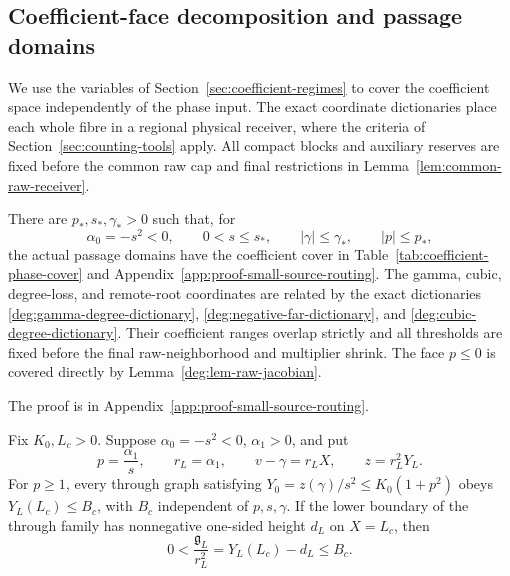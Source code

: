 \subsection{Coefficient-face decomposition and passage domains}
\label{sec:coefficient-limits}
\label{sec:parameter-degenerations}

We use the variables of Section~\ref{sec:coefficient-regimes} to cover the
coefficient space independently of the phase input. The exact coordinate
dictionaries place each whole fibre in a regional physical receiver,
where the criteria of Section~\ref{sec:counting-tools} apply. All compact
blocks and auxiliary reserves are fixed before the common raw cap and
final restrictions in Lemma~\ref{lem:common-raw-receiver}.

\label{subsec:deg-exhaustion}

\begin{lemma}
\label{deg:lem-small-source-routing}
There are \(p_*,s_*,\gamma_*>0\) such that, for
\[
 \alpha _0=-s^2<0,\qquad
 0<s\le s_*,\qquad |\gamma|\le\gamma_*,\qquad |p|\le p_*,
\]
the actual passage domains have the coefficient cover in
Table~\ref{tab:coefficient-phase-cover} and
Appendix~\ref{app:proof-small-source-routing}.
The gamma, cubic, degree-loss, and remote-root coordinates are related
by the exact dictionaries \eqref{deg:gamma-degree-dictionary},
\eqref{deg:negative-far-dictionary}, and
\eqref{deg:cubic-degree-dictionary}. Their coefficient ranges overlap
strictly and all thresholds are fixed before the final raw-neighborhood
and multiplier shrink. The face \(p\le0\) is covered directly by
Lemma~\ref{deg:lem-raw-jacobian}.
\end{lemma}

The proof is in Appendix~\ref{app:proof-small-source-routing}.

\begin{lemma}
\label{lem:large-ratio-height}
Fix \(K_0,L_c>0\).  Suppose
\(\alpha _0=-s^2<0\), \(\alpha _1>0\), and put
\[
 p=\frac{\alpha _1}{s},\qquad r_L=\alpha _1,\qquad
 v-\gamma=r_LX,\qquad z=r_L^2Y_L.
\]
For \(p\ge1\), every through graph satisfying
\(Y_0=z(\gamma)/s^2\le K_0(1+p^2)\) obeys
\(Y_L(L_c)\le B_c\), with \(B_c\) independent of
\(p,s,\gamma\).  If the lower boundary of the through family has
nonnegative one-sided height \(d_L\) on \(X=L_c\), then
\begin{equation}
 0<\frac{\mathfrak g_L}{r_L^2}
 =Y_L(L_c)-d_L\le B_c.
 \label{deg:large-ratio-gap}
\end{equation}
\end{lemma}

